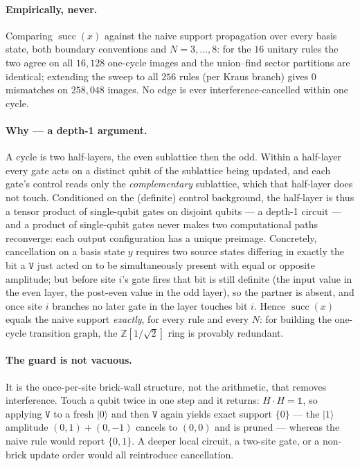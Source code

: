 \documentclass[11pt]{article}
\newcommand{\rt}[1]{\texttt{#1}}
\newcommand{\Zsqrt}{\ensuremath{\mathbb{Z}[1/\sqrt{2}]}}
\begin{document}
\paragraph{Empirically, never.} Comparing $\operatorname{succ}(x)$ against the
naive support propagation over every basis state, both boundary conventions and
$N=3,\dots,8$: for the $16$ unitary rules the two agree on all $16{,}128$
one-cycle images and the union--find sector partitions are identical; extending
the sweep to all $256$ rules (per Kraus branch) gives $0$ mismatches on
$258{,}048$ images. No edge is ever interference-cancelled within one cycle.

\paragraph{Why --- a depth-1 argument.} A cycle is two half-layers, the even
sublattice then the odd. Within a half-layer every gate acts on a distinct qubit
of the sublattice being updated, and each gate's control reads only the
\emph{complementary} sublattice, which that half-layer does not touch. Conditioned
on the (definite) control background, the half-layer is thus a tensor product of
single-qubit gates on disjoint qubits --- a depth-1 circuit --- and a product of
single-qubit gates never makes two computational paths reconverge: each output
configuration has a unique preimage. Concretely, cancellation on a basis state
$y$ requires two source states differing in exactly the bit a $\rt V$ just acted
on to be simultaneously present with equal or opposite amplitude; but before site
$i$'s gate fires that bit is still definite (the input value in the even layer,
the post-even value in the odd layer), so the partner is absent, and once site
$i$ branches no later gate in the layer touches bit $i$. Hence
$\operatorname{succ}(x)$ equals the naive support \emph{exactly}, for every rule
and every $N$: for building the one-cycle transition graph, the \Zsqrt{} ring is
provably redundant.

\paragraph{The guard is not vacuous.} It is the once-per-site brick-wall
structure, not the arithmetic, that removes interference. Touch a qubit twice in
one step and it returns: $H\!\cdot\!H=\mathbb{1}$, so applying $\rt V$ to a fresh
$|0\rangle$ and then $\rt V$ again yields exact support $\{0\}$ --- the
$|1\rangle$ amplitude $(0,1)\!+\!(0,-1)$ cancels to $(0,0)$ and is pruned ---
whereas the naive rule would report $\{0,1\}$. A deeper local circuit, a
two-site gate, or a non-brick update order would all reintroduce cancellation.
\end{document}
